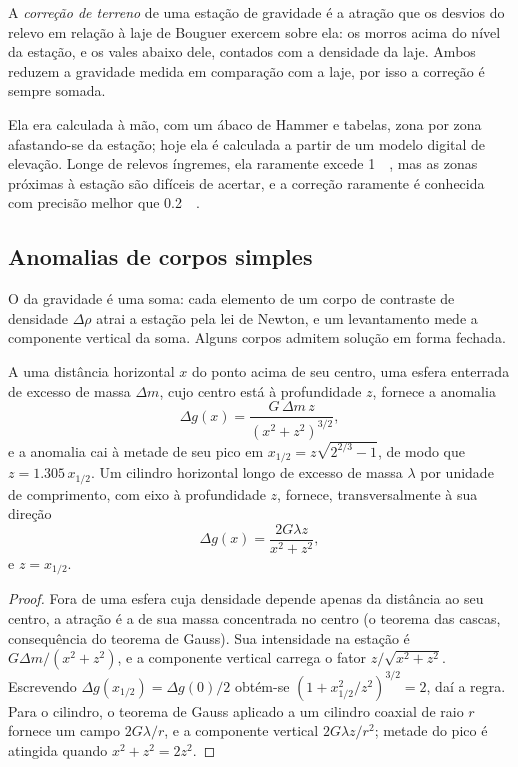 \begin{definition}\label{def:b3:field-lab-methods-3:terrain}
A \emph{correção de terreno} de uma estação
de gravidade é a atração que os desvios do relevo em relação à
laje de Bouguer exercem sobre ela: os morros acima do nível da estação, e
os vales abaixo dele, contados com a densidade da laje. Ambos reduzem
a gravidade medida em comparação com a laje, por isso a correção é
sempre somada.
\end{definition}

Ela era calculada à mão, com um ábaco de Hammer e tabelas, zona por zona
afastando-se da estação; hoje ela é calculada a partir de um modelo digital
de elevação. Longe de relevos íngremes, ela raramente excede \qty{1}{\milli\gal},
mas as zonas próximas à estação são difíceis de acertar, e a
correção raramente é conhecida com precisão melhor que \qty{0.2}{\milli\gal}.

\subsection{Anomalias de corpos simples}

O  da gravidade é uma soma: cada elemento de um corpo de
contraste de densidade $\Delta\rho$ atrai a estação pela lei de Newton, e
um levantamento mede a componente vertical da soma. Alguns corpos admitem
solução em forma fechada.

\begin{theorem}\label{thm:b3:field-lab-methods-3:sphere}
A uma distância horizontal $x$ do ponto acima de seu centro, uma esfera
enterrada de excesso de massa $\Delta m$, cujo centro está à profundidade $z$, fornece a
anomalia
\[
\Delta g(x) = \frac{G\,\Delta m\,z}{(x^2 + z^2)^{3/2}} ,
\]
e a anomalia cai à metade de seu pico em $x_{1/2} = z\sqrt{2^{2/3} - 1}$,
de modo que $z = 1.305\,x_{1/2}$. Um cilindro horizontal longo de excesso de massa
$\lambda$ por unidade de comprimento, com eixo à profundidade $z$, fornece, transversalmente à sua
direção
\[
\Delta g(x) = \frac{2G\lambda z}{x^2 + z^2} ,
\]
e $z = x_{1/2}$.
\end{theorem}

\begin{proof}
Fora de uma esfera cuja densidade depende apenas da distância ao seu
centro, a atração é a de sua massa concentrada no centro (o
teorema das cascas, consequência do teorema de Gauss). Sua intensidade na
estação é $G\Delta m/(x^2 + z^2)$, e a componente vertical carrega o
fator $z/\sqrt{x^2 + z^2}$. Escrevendo $\Delta g(x_{1/2}) =
\Delta g(0)/2$ obtém-se $(1 + x_{1/2}^2/z^2)^{3/2} = 2$, daí a regra. Para
o cilindro, o teorema de Gauss aplicado a um cilindro coaxial de raio $r$ fornece
um campo $2G\lambda/r$, e a componente vertical $2G\lambda z/r^2$;
metade do pico é atingida quando $x^2 + z^2 = 2z^2$.
\end{proof}

